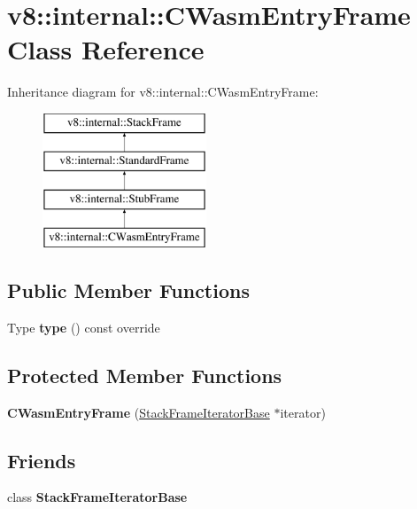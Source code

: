 \hypertarget{classv8_1_1internal_1_1CWasmEntryFrame}{}\section{v8\+:\+:internal\+:\+:C\+Wasm\+Entry\+Frame Class Reference}
\label{classv8_1_1internal_1_1CWasmEntryFrame}
Inheritance diagram for v8\+:\+:internal\+:\+:C\+Wasm\+Entry\+Frame\+:\begin{figure}[H]
\begin{center}
\leavevmode
\includegraphics[height=4.000000cm]{classv8_1_1internal_1_1CWasmEntryFrame}
\end{center}
\end{figure}
\subsection*{Public Member Functions}
\begin{DoxyCompactItemize}
\item 
\mbox{\label{classv8_1_1internal_1_1CWasmEntryFrame_a43af80364e394509ca6d3de5ad115040}} 
Type {\bfseries type} () const override
\end{DoxyCompactItemize}
\subsection*{Protected Member Functions}
\begin{DoxyCompactItemize}
\item 
\mbox{\label{classv8_1_1internal_1_1CWasmEntryFrame_ab8201df4d10ef116e4e0681339ebacbd}} 
{\bfseries C\+Wasm\+Entry\+Frame} (\mbox{\hyperlink{classv8_1_1internal_1_1StackFrameIteratorBase}{Stack\+Frame\+Iterator\+Base}} $\ast$iterator)
\end{DoxyCompactItemize}
\subsection*{Friends}
\begin{DoxyCompactItemize}
\item 
\mbox{\label{classv8_1_1internal_1_1CWasmEntryFrame_ac7310421866976ca454bbe11c5f926c3}} 
class {\bfseries Stack\+Frame\+Iterator\+Base}
\end{DoxyCompactItemize}
